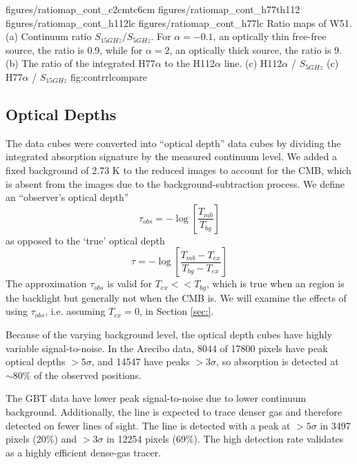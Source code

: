 \FigureFour
{figures/ratiomap_cont_c2cmtc6cm}
{figures/ratiomap_cont_h77th112}
{figures/ratiomap_cont_h112lc}
{figures/ratiomap_cont_h77lc}
{Ratio maps of W51.  
(a) Continuum ratio $S_{15 GHz} / S_{5 GHz}$.  For $\alpha=-0.1$, an optically
thin free-free source, the ratio is 0.9, while for $\alpha=2$, an optically thick source,
the ratio is 9.
(b) The ratio of the integrated H77$\alpha$ to the H112$\alpha$ line.
(c) H112$\alpha$ / $S_{5 GHz}$
(c) H77$\alpha$ / $S_{15 GHz}$
}
{fig:contrrlcompare}

\subsection{Optical Depths}

The data cubes were converted into ``optical depth'' data cubes by dividing the
integrated \formaldehyde absorption signature by the measured continuum level.
We added a fixed background of 2.73 K to the reduced images to account for the
CMB, which is absent from the images due to the background-subtraction
process.  We define an ``observer's optical depth''
\begin{equation}
    \tau_{obs} = -\log\left[\frac{T_{mb}}{T_{bg}}\right]
\end{equation}
as opposed to the `true' optical depth
\begin{equation}
    \tau = -\log\left[\frac{T_{mb}-T_{ex}}{T_{bg}-T_{ex}}\right]
\end{equation}
The approximation $\tau_{obs}$ is valid for $T_{ex} << T_{bg}$, which is true when an
\hii region is the backlight but generally not when the CMB is.  We will examine the effects
of using $\tau_{obs}$, i.e. assuming $T_{ex} = 0$, in Section \ref{sec:}.


Because of the varying background level, the optical depth cubes have highly
variable signal-to-noise.  In the Arecibo data, 8044 of 17800 pixels have peak
optical depths $>5\sigma$, and 14547 have peaks $>3\sigma$, so \formaldehyde
absorption is detected at $\sim80\%$ of the observed positions.

The GBT \formaldehyde \twotwo data have lower peak signal-to-noise due to lower
continuum background.  Additionally, the \twotwo line is expected to trace
denser gas and therefore detected on fewer lines of sight.  The \twotwo line is
detected with a peak at $>5\sigma$ in 3497 pixels (20\%) and $>3\sigma$ in
12254 pixels (69\%).  The high detection rate validates \formaldehyde as a
highly efficient dense-gas tracer.

